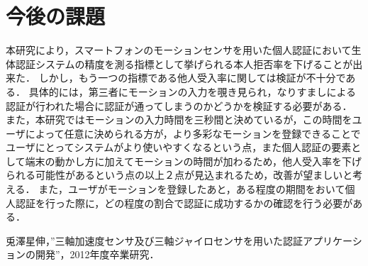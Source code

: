 \documentclass[11pt]{jarticle}
\begin{document}
\section{今後の課題}
本研究により，スマートフォンのモーションセンサを用いた個人認証において生体認証システムの精度を測る指標として挙げられる本人拒否率を下げることが出来た．
しかし，もう一つの指標である他人受入率に関しては検証が不十分である．
具体的には，第三者にモーションの入力を覗き見られ，なりすましによる認証が行われた場合に認証が通ってしまうのかどうかを検証する必要がある．
また，本研究ではモーションの入力時間を三秒間と決めているが，この時間をユーザによって任意に決められる方が，より多彩なモーションを登録できることでユーザにとってシステムがより使いやすくなるという点，また個人認証の要素として端末の動かし方に加えてモーションの時間が加わるため，他人受入率を下げられる可能性があるという点の以上２点が見込まれるため，改善が望ましいと考える．
また，ユーザがモーションを登録したあと，ある程度の期間をおいて個人認証を行った際に，どの程度の割合で認証に成功するかの確認を行う必要がある．

\begin{thebibliography}{9}
    兎澤星伸，”三軸加速度センサ及び三軸ジャイロセンサを用いた認証アプリケーションの開発”，2012年度卒業研究．
\end{thebibliography}
\end{document}
